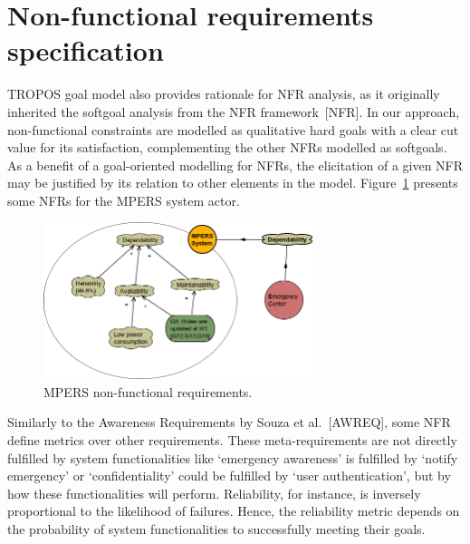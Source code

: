 \section{Non-functional requirements specification}


TROPOS goal model also provides rationale for NFR analysis, as it originally inherited the softgoal analysis from the NFR framework~[NFR]. In our approach, non-functional constraints are modelled as qualitative hard goals with a clear cut value for its satisfaction, complementing the other NFRs modelled as softgoals. As a benefit of a goal-oriented modelling for NFRs, the elicitation of a given NFR may be justified by its relation to other elements in the model. Figure~\ref{fig:MPERS_NFR} presents some NFRs for the MPERS system actor.

\begin{figure}[h!]
\centering
\includegraphics[width=0.7\textwidth]{imgs/MPERS_NFR.png}
\caption{MPERS non-functional requirements.}
\label{fig:MPERS_NFR}
\end{figure}

Similarly to the Awareness Requirements by Souza et al.~[AWREQ], some NFR define metrics over other requirements. These meta-requirements are not directly fulfilled by system functionalities like `emergency awareness' is fulfilled by `notify emergency' or `confidentiality' could be fulfilled by `user authentication', but by how these functionalities will perform. Reliability, for instance, is inversely proportional to the likelihood of failures. Hence, the reliability metric depends on the probability of system functionalities to successfully meeting their goals. 


